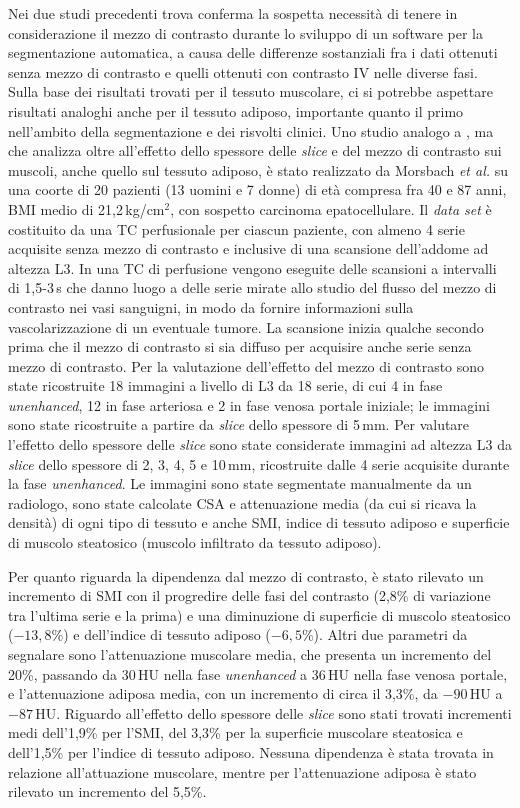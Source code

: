 Nei due studi precedenti trova conferma la sospetta necessità di tenere in considerazione il mezzo di contrasto durante lo sviluppo di un software per la segmentazione automatica, a causa delle differenze sostanziali fra i dati ottenuti senza mezzo di contrasto e quelli ottenuti con contrasto IV nelle diverse fasi. Sulla base dei risultati trovati per il tessuto muscolare, ci si potrebbe aspettare risultati analoghi anche per il tessuto adiposo, importante quanto il primo nell'ambito della segmentazione e dei risvolti clinici.
Uno studio analogo a \cite{Fuchs2018}, ma che analizza oltre all'effetto dello spessore delle \textit{slice} e del mezzo di contrasto sui muscoli, anche quello sul tessuto adiposo, è stato realizzato da Morsbach \textit{et al.} \cite{Morsbach2019} su una coorte di 20 pazienti (13 uomini e 7 donne) di età compresa fra 40 e 87 anni, BMI medio di 21,2\,kg/$\text{cm}^2$, con sospetto carcinoma epatocellulare. Il \textit{data set} è costituito da una TC perfusionale per ciascun paziente, con almeno 4 serie acquisite senza mezzo di contrasto e inclusive di una scansione dell'addome ad altezza L3. In una TC di perfusione vengono eseguite delle scansioni a intervalli di 1,5-3\,s che danno luogo a delle serie mirate allo studio del flusso del mezzo di contrasto nei vasi sanguigni, in modo da fornire informazioni sulla vascolarizzazione di un eventuale  tumore. La scansione inizia qualche secondo prima che il mezzo di contrasto si sia diffuso per acquisire anche serie senza mezzo di contrasto. Per la valutazione dell'effetto del mezzo di contrasto sono state ricostruite 18 immagini a livello di L3 da 18 serie, di cui 4 in fase \textit{unenhanced}, 12 in fase arteriosa e 2 in fase venosa portale iniziale; le immagini sono state ricostruite a partire da \textit{slice} dello spessore di 5\,mm. Per valutare l’effetto dello spessore delle \textit{slice} sono state considerate immagini ad altezza L3 da \textit{slice} dello spessore di 2, 3, 4, 5 e 10\,mm, ricostruite dalle 4 serie acquisite durante la fase \textit{unenhanced}. Le immagini sono state segmentate manualmente da un radiologo, sono state calcolate CSA e attenuazione media (da cui si ricava la densità) di ogni tipo di tessuto e anche SMI, indice di tessuto adiposo e superficie di muscolo steatosico (muscolo infiltrato da tessuto adiposo).

Per quanto riguarda la dipendenza dal mezzo di contrasto, è stato rilevato un incremento di SMI con il progredire delle fasi del contrasto (2,8\% di variazione tra l’ultima serie e la prima) e una diminuzione di superficie di muscolo steatosico ($-13,8\%$) e dell'indice di tessuto adiposo ($-6,5\%$). Altri due parametri da segnalare sono l’attenuazione muscolare media, che presenta un incremento del 20\%, passando da 30\,HU nella fase \textit{unenhanced} a 36\,HU nella fase venosa portale, e l’attenuazione adiposa media, con un incremento di circa il 3,3\%, da $-90$\,HU a $-87$\,HU. Riguardo all'effetto dello spessore delle \textit{slice} sono stati trovati incrementi medi dell’1,9\% per l’SMI, del 3,3\% per la superficie muscolare steatosica e dell’1,5\% per l’indice di tessuto adiposo. Nessuna dipendenza è stata trovata in relazione all'attuazione muscolare, mentre per l’attenuazione adiposa è stato rilevato un incremento del 5,5\%.

